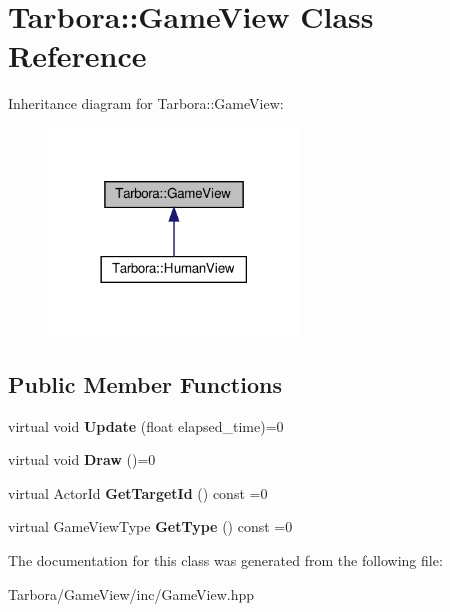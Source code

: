 \hypertarget{classTarbora_1_1GameView}{}\section{Tarbora\+:\+:Game\+View Class Reference}
\label{classTarbora_1_1GameView}


Inheritance diagram for Tarbora\+:\+:Game\+View\+:\nopagebreak
\begin{figure}[H]
\begin{center}
\leavevmode
\includegraphics[width=189pt]{classTarbora_1_1GameView__inherit__graph}
\end{center}
\end{figure}
\subsection*{Public Member Functions}
\begin{DoxyCompactItemize}
\item 
\mbox{\label{classTarbora_1_1GameView_a47e348dcfef2584056d5e8d30803e699}} 
virtual void {\bfseries Update} (float elapsed\+\_\+time)=0
\item 
\mbox{\label{classTarbora_1_1GameView_a543ae59aac06df35b66154cb52ecaeb4}} 
virtual void {\bfseries Draw} ()=0
\item 
\mbox{\label{classTarbora_1_1GameView_a525064b3328803ff10e23f4c85cfd2f6}} 
virtual Actor\+Id {\bfseries Get\+Target\+Id} () const =0
\item 
\mbox{\label{classTarbora_1_1GameView_a6971252bca530205e091e7a705c46e8b}} 
virtual Game\+View\+Type {\bfseries Get\+Type} () const =0
\end{DoxyCompactItemize}


The documentation for this class was generated from the following file\+:\begin{DoxyCompactItemize}
\item 
Tarbora/\+Game\+View/inc/Game\+View.\+hpp\end{DoxyCompactItemize}
